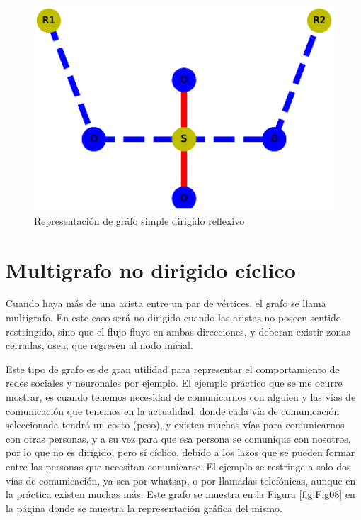 \documentclass{article}
\begin{document}


\begin{figure}
    \centering
    \includegraphics[scale=0.6]{imagenes/Fig07.eps}
    \caption{Representación de gráfo simple dirigido reflexivo}
    \label{fig:Fig07}
\end{figure}

\section{Multigrafo no dirigido cíclico}

Cuando haya más de una arista entre un par de vértices, el grafo se llama multigrafo. En este caso será no dirigido cuando las aristas no poseen sentido restringido, sino que el flujo fluye en ambas direcciones, y deberan existir zonas cerradas, osea, que regresen al nodo inicial.

Este tipo de grafo es de gran utilidad para representar el comportamiento de redes sociales y neuronales por ejemplo. El ejemplo práctico que se me ocurre mostrar, es cuando tenemos necesidad de comunicarnos con alguien y las vías de comunicación que tenemos en la actualidad, donde cada vía de comunicación seleccionada tendrá un costo (peso), y existen muchas vías para comunicarnos con otras personas, y a su vez para que esa persona se comunique con nosotros, por lo que no es dirigido, pero sí cíclico, debido a los lazos que se pueden formar entre las personas que necesitan comunicarse. El ejemplo se restringe a solo dos vías de comunicación, ya sea por whatsap, o por llamadas telefónicas, aunque en la práctica existen muchas más. Este grafo se muestra en la Figura \ref{fig:Fig08} en la página \pageref{fig:Fig08} donde se muestra la representación gráfica del mismo. 
\end{document}
